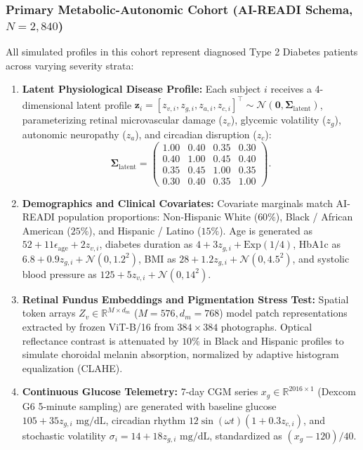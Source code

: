 \documentclass[a4paper,fleqn]{cas-dc}
\begin{document}
\subsubsection{Primary Metabolic-Autonomic Cohort (AI-READI Schema, $N=2{,}840$)}
All simulated profiles in this cohort represent diagnosed Type 2 Diabetes patients across varying severity strata:
\begin{enumerate}
    \item \textbf{Latent Physiological Disease Profile:} Each subject $i$ receives a 4-dimensional latent profile $\mathbf{z}_i = [z_{v, i}, z_{g, i}, z_{a, i}, z_{c, i}]^\top \sim \mathcal{N}(\mathbf{0}, \boldsymbol{\Sigma}_{\text{latent}})$, parameterizing retinal microvascular damage ($z_v$), glycemic volatility ($z_g$), autonomic neuropathy ($z_a$), and circadian disruption ($z_c$):
    \begin{equation}
        \boldsymbol{\Sigma}_{\text{latent}} = \begin{pmatrix} 1.00 & 0.40 & 0.35 & 0.30 \\ 0.40 & 1.00 & 0.45 & 0.40 \\ 0.35 & 0.45 & 1.00 & 0.35 \\ 0.30 & 0.40 & 0.35 & 1.00 \end{pmatrix}.
    \end{equation}
    \item \textbf{Demographics and Clinical Covariates:} Covariate marginals match AI-READI population proportions: Non-Hispanic White ($60\%$), Black / African American ($25\%$), and Hispanic / Latino ($15\%$). Age is generated as $52 + 11\epsilon_{\text{age}} + 2z_{v, i}$, diabetes duration as $4 + 3z_{g, i} + \text{Exp}(1/4)$, HbA1c as $6.8 + 0.9z_{g, i} + \mathcal{N}(0, 1.2^2)$, BMI as $28 + 1.2z_{g, i} + \mathcal{N}(0, 4.5^2)$, and systolic blood pressure as $125 + 5z_{v, i} + \mathcal{N}(0, 14^2)$.
    \item \textbf{Retinal Fundus Embeddings and Pigmentation Stress Test:} Spatial token arrays $Z_v \in \mathbb{R}^{M \times d_m}$ ($M=576, d_m=768$) model patch representations extracted by frozen ViT-B/16 from $384 \times 384$ photographs. Optical reflectance contrast is attenuated by $10\%$ in Black and Hispanic profiles to simulate choroidal melanin absorption, normalized by adaptive histogram equalization (CLAHE).
    \item \textbf{Continuous Glucose Telemetry:} 7-day CGM series $x_g \in \mathbb{R}^{2016 \times 1}$ (Dexcom G6 5-minute sampling) are generated with baseline glucose $105 + 35z_{g, i}\text{ mg/dL}$, circadian rhythm $12\sin(\omega t)(1 + 0.3z_{c, i})$, and stochastic volatility $\sigma_i = 14 + 18z_{g, i}\text{ mg/dL}$, standardized as $(x_g - 120)/40$.

\end{enumerate}
\end{document}
